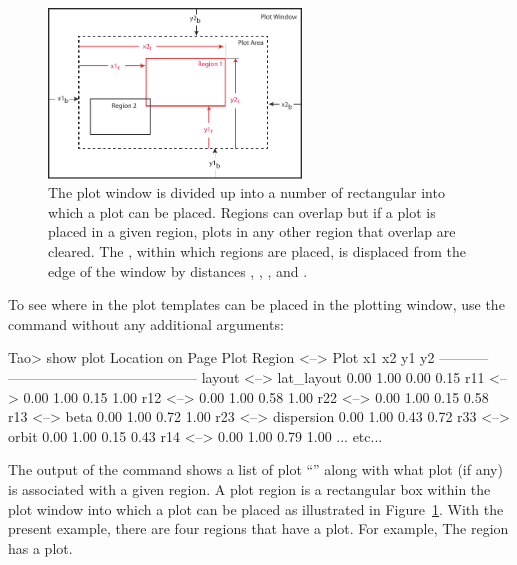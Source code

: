 \documentclass{hitec}     %
\begin{document}
\begin{figure}[b]
  \centering
  \includegraphics[width=0.6\textwidth]{plot-page.pdf}
  \caption{The plot window is divided up into a number of rectangular  into
which a plot  can be placed. Regions can overlap but if a plot is placed
in a given region, plots in any other region that overlap are cleared. The , within which
regions are placed, is displaced from the edge of the window by distances ,
, , and .}
  \label{f:plot.regions}
\end{figure}


To see where in the plot templates can be placed in the plotting window, use the  command without
any additional arguments:
\begin{code}
Tao> show plot
                                               Location on Page
Plot Region         <-->  Plot                 x1    x2    y1    y2
-----------               -----------------------------------------
layout              <-->  lat_layout          0.00  1.00  0.00  0.15
r11                 <-->                      0.00  1.00  0.15  1.00
r12                 <-->                      0.00  1.00  0.58  1.00
r22                 <-->                      0.00  1.00  0.15  0.58
r13                 <-->  beta                0.00  1.00  0.72  1.00
r23                 <-->  dispersion          0.00  1.00  0.43  0.72
r33                 <-->  orbit               0.00  1.00  0.15  0.43
r14                 <-->                      0.00  1.00  0.79  1.00
... etc...
\end{code}
The output of the command shows a list of plot ``'' along with what plot (if any) is
associated with a given region. A plot region is a rectangular box within the plot window into which
a plot can be placed as illustrated in Figure~\ref{f:plot.regions}. With the present example, there
are four regions that have a plot. For example, The  region has a  plot.
\end{document}
